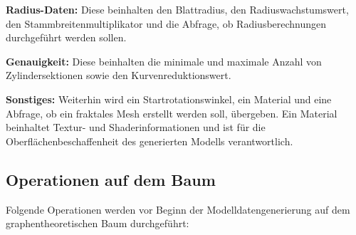 \begin{description}
	\item \textbf{Radius-Daten:} Diese beinhalten den Blattradius, den Radiuswachstumswert, den Stammbreitenmultiplikator und die Abfrage, ob Radius\-be\-rech\-nung\-en durch\-ge\-führt werden sollen. \\
	
	\item \textbf{Genauigkeit:} Diese beinhalten die minimale und maximale Anzahl von Zylindersektionen sowie den Kurvenreduktionswert. \\
	
	\item \textbf{Sonstiges:} Weiterhin wird ein Startrotationswinkel, ein Material und eine Abfrage, ob ein fraktales Mesh erstellt werden soll, übergeben. Ein Material beinhaltet Textur- und Shaderinformationen und ist für die Oberflächenbeschaffenheit des generierten Modells verantwortlich.
\end{description}

\subsection{Operationen auf dem Baum}

Folgende Operationen werden vor Beginn der Modelldatengenerierung auf dem graphentheoretischen Baum durchgeführt:

